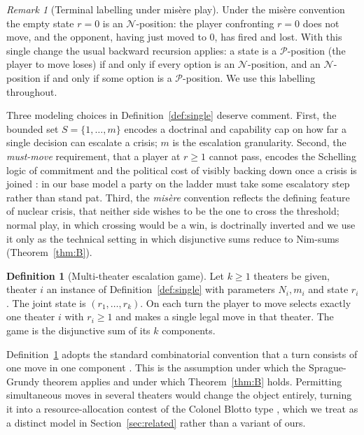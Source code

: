 \documentclass[11pt]{article}
\theoremstyle{plain}
\theoremstyle{definition}
\newtheorem{definition}[theorem]{Definition}
\theoremstyle{remark}
\newtheorem{remark}[theorem]{Remark}
\begin{document}
\begin{remark}[Terminal labelling under mis\`ere play]\label{rem:terminal}
Under the mis\`ere convention the empty state $r=0$ is an
$\mathcal{N}$-position: the player confronting $r=0$ does not move, and the
opponent, having just moved to $0$, has fired and lost. With this single
change the usual backward recursion applies: a state is a
$\mathcal{P}$-position (the player to move loses) if and only if every option
is an $\mathcal{N}$-position, and an $\mathcal{N}$-position if and only if
some option is a $\mathcal{P}$-position. We use this labelling throughout.
\end{remark}

Three modeling choices in Definition~\ref{def:single} deserve comment.
First, the bounded set $S=\{1,\dots,m\}$ encodes a doctrinal and capability
cap on how far a single decision can escalate a crisis; $m$ is the
escalation granularity. Second, the \emph{must-move} requirement, that a
player at $r\ge 1$ cannot pass, encodes the Schelling logic of commitment
and the political cost of visibly backing down once a crisis is joined
\citep{schelling1960, schelling1966}: in our base model a party on the
ladder must take some escalatory step rather than stand pat. Third, the
\emph{mis\`ere} convention reflects the defining feature of nuclear crisis,
that neither side wishes to be the one to cross the threshold; normal play,
in which crossing would be a win, is doctrinally inverted and we use it only
as the technical setting in which disjunctive sums reduce to Nim-sums
(Theorem~\ref{thm:B}).

\begin{definition}[Multi-theater escalation game]\label{def:multi}
Let $k\ge 1$ theaters be given, theater $i$ an instance of
Definition~\ref{def:single} with parameters $N_i, m_i$ and state $r_i$. The
joint state is $(r_1,\dots,r_k)$. On each turn the player to move selects
exactly one theater $i$ with $r_i\ge 1$ and makes a single legal move in
that theater. The game is the disjunctive sum of its $k$ components.
\end{definition}

Definition~\ref{def:multi} adopts the standard combinatorial convention that
a turn consists of one move in one component \citep{bcg1982, siegel2013}.
This is the assumption under which the Sprague-Grundy theorem applies and
under which Theorem~\ref{thm:B} holds. Permitting simultaneous moves in
several theaters would change the object entirely, turning it into a
resource-allocation contest of the Colonel Blotto type
\citep{roberson2006}, which we treat as a distinct model in
Section~\ref{sec:related} rather than a variant of ours.
\end{document}
